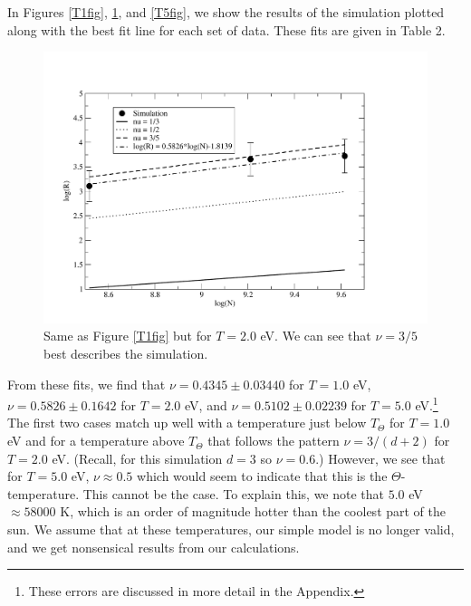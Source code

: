 \documentclass{article}
\begin{document}
\begin{multicols}{2}
In Figures \ref{T1fig}, \ref{T2fig}, and \ref{T5fig}, we show the results of the simulation plotted along with the best fit line for each set of data.  These fits are given in Table 2.  \\

\begin{figure}[H]
\begin{center}
\includegraphics[width=\linewidth]{Figures/T2plot.pdf}
\caption{Same as Figure \ref{T1fig} but for $T=2.0$ eV.  We can see that $\nu = 3/5$ best describes the simulation.}
\label{T2fig}
\end{center}
\end{figure}

From these fits, we find that $\nu = 0.4345 \pm 0.03440$ for $T=1.0$ eV, $\nu = 0.5826 \pm 0.1642$ for $T = 2.0$ eV, and $\nu = 0.5102 \pm 0.02239$ for $T = 5.0$ eV.\footnote{These errors are discussed in more detail in the Appendix.}  The first two cases match up well with a temperature just below $T_{\Theta}$ for $T=1.0$ eV and for a temperature above $T_{\Theta}$ that follows the pattern $\nu = 3/(d+2)$ for $T = 2.0$ eV.  (Recall, for this simulation $d=3$ so $\nu = 0.6$.)  However, we see that for $T = 5.0$ eV, $\nu \approx 0.5$ which would seem to indicate that this is the $\Theta$-temperature. This cannot be the case.  To explain this, we note that $5.0$ eV $\approx 58000$ K, which is an order of magnitude hotter than the coolest part of the sun.  \cite{sun}  We assume that at these temperatures, our simple model is no longer valid, and we get nonsensical results from our calculations.  \\


\end{multicols}
\end{document}
